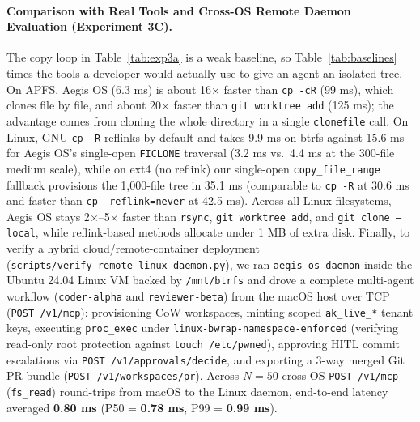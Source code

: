 \documentclass[10pt,twocolumn]{article}
\begin{document}
\paragraph{Comparison with Real Tools and Cross-OS Remote Daemon Evaluation (Experiment 3C).} The copy loop in Table~\ref{tab:exp3a} is a weak baseline, so Table~\ref{tab:baselines} times the tools a developer would actually use to give an agent an isolated tree. On APFS, Aegis OS (6.3 ms) is about 16$\times$ faster than \texttt{cp -cR} (99 ms), which clones file by file, and about 20$\times$ faster than \texttt{git worktree add} (125 ms); the advantage comes from cloning the whole directory in a single \texttt{clonefile} call. On Linux, GNU \texttt{cp -R} reflinks by default and takes 9.9 ms on btrfs against 15.6 ms for Aegis OS's single-open \texttt{FICLONE} traversal (3.2 ms vs.\ 4.4 ms at the 300-file medium scale), while on ext4 (no reflink) our single-open \texttt{copy\_file\_range} fallback provisions the 1,000-file tree in 35.1 ms (comparable to \texttt{cp -R} at 30.6 ms and faster than \texttt{cp --reflink=never} at 42.5 ms). Across all Linux filesystems, Aegis OS stays 2$\times$--5$\times$ faster than \texttt{rsync}, \texttt{git worktree add}, and \texttt{git clone --local}, while reflink-based methods allocate under 1 MB of extra disk. Finally, to verify a hybrid cloud/remote-container deployment (\texttt{scripts/verify\_remote\_linux\_daemon.py}), we ran \texttt{aegis-os daemon} inside the Ubuntu 24.04 Linux VM backed by \texttt{/mnt/btrfs} and drove a complete multi-agent workflow (\texttt{coder-alpha} and \texttt{reviewer-beta}) from the macOS host over TCP (\texttt{POST /v1/mcp}): provisioning CoW workspaces, minting scoped \texttt{ak\_live\_*} tenant keys, executing \texttt{proc\_exec} under \texttt{linux-bwrap-namespace-enforced} (verifying read-only root protection against \texttt{touch /etc/pwned}), approving HITL commit escalations via \texttt{POST /v1/approvals/decide}, and exporting a 3-way merged Git PR bundle (\texttt{POST /v1/workspaces/pr}). Across $N{=}50$ cross-OS \texttt{POST /v1/mcp} (\texttt{fs\_read}) round-trips from macOS to the Linux daemon, end-to-end latency averaged \textbf{0.80 ms} (P50 = \textbf{0.78 ms}, P99 = \textbf{0.99 ms}).
\end{document}
